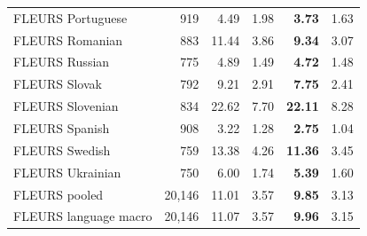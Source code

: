 \begin{table}[!ht]
\begin{tabular}{lrrrrr}
FLEURS Portuguese & 919 & 4.49 & 1.98 & \textbf{3.73} & 1.63\\
FLEURS Romanian & 883 & 11.44 & 3.86 & \textbf{9.34} & 3.07\\
FLEURS Russian & 775 & 4.89 & 1.49 & \textbf{4.72} & 1.48\\
FLEURS Slovak & 792 & 9.21 & 2.91 & \textbf{7.75} & 2.41\\
FLEURS Slovenian & 834 & 22.62 & 7.70 & \textbf{22.11} & 8.28\\
FLEURS Spanish & 908 & 3.22 & 1.28 & \textbf{2.75} & 1.04\\
FLEURS Swedish & 759 & 13.38 & 4.26 & \textbf{11.36} & 3.45\\
FLEURS Ukrainian & 750 & 6.00 & 1.74 & \textbf{5.39} & 1.60\\
\midrule
FLEURS pooled & 20,146 & 11.01 & 3.57 & \textbf{9.85} & 3.13\\
FLEURS language macro & 20,146 & 11.07 & 3.57 & \textbf{9.96} & 3.15\\
\bottomrule
\end{tabular}
\end{table}
